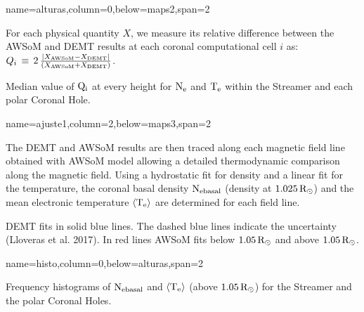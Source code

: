 \documentclass[paperwidth=100cm,paperheight=120cm]{baposter}
\def\azul#1{\textcolor{blue}{#1}}
\begin{document}
\begin{poster}
{name=alturas,column=0,below=maps2,span=2}{
{\footnotesize\sf
For each physical quantity $X$, we measure its relative difference between the AWSoM and DEMT results at each coronal computational cell $i$ as: 
$Q_i\,\equiv\,2\,\frac{|X_{\rm AWSoM} - X_{\rm DEMT}|}{(X_{\rm AWSoM} + X_{\rm DEMT})}$.
\begin{center}
\end{center}
\vskip -0.16cm
Median value of ${\rm Q_i}$ at every height for ${\rm N_e}$ and ${\rm T_e}$ within the Streamer and each polar Coronal Hole.

}
}

{name=ajuste1,column=2,below=maps3,span=2}{
{\footnotesize\sf
The DEMT and AWSoM results are then traced along each magnetic field line obtained with AWSoM model allowing a detailed thermodynamic comparison along the magnetic field. Using a hydrostatic fit for density and a linear fit for the temperature, the coronal basal density ${\rm N_{e basal}}$ (density at $1.025 \, {\rm R}_\odot$) and the mean electronic temperature ${\langle \rm T_e \rangle}$ are determined for each field line.
\begin{center}
\end{center}
DEMT fits in solid blue lines. The dashed blue lines indicate the uncertainty (Lloveras {\rm et al.} 2017). In red lines AWSoM fits below $1.05 \, {\rm R}_\odot$ and above $1.05 \, {\rm R}_\odot$.

}
}

{name=histo,column=0,below=alturas,span=2}{
{\footnotesize\sf
\begin{center}
\end{center}
\vskip -0.16cm
Frequency histograms of ${\rm N_{e basal}}$ and ${\rm \langle T_e \rangle}$ (above $1.05 \, {\rm R}_\odot$) for the Streamer and the polar Coronal Holes.

}}
\end{poster}
\end{document}
